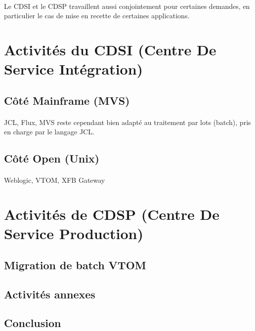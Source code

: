 \documentclass[a4paper,12pt]{report}
\begin{document}
	\paragraph{}
	Le CDSI et le CDSP travaillent aussi conjointement pour certaines demandes, en particulier le cas de mise en recette de certaines applications.
	
\newpage	
\section{Activités du CDSI (Centre De Service Intégration)}
	\subsection{Côté Mainframe (MVS)}
	\paragraph*{}
	JCL, Flux, MVS reste cependant bien adapté au traitement par lots (batch), pris en charge par le langage JCL.
	
	\subsection{Côté Open (Unix)}
	\paragraph*{}
	Weblogic, VTOM, XFB Gateway 
	
\newpage	
\section{Activités de CDSP (Centre De Service Production)}
	\subsection{Migration de batch VTOM}
	\paragraph*{}
	
	
	\subsection{Activités annexes}
	\paragraph*{}
	
	
\newpage	
\begin{center}
\section*{Conclusion}
\end{center}
\paragraph*{}
\end{document}

